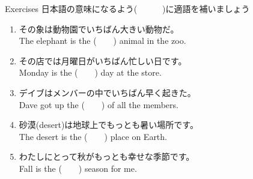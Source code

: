 \documentclass[aspectratio=169,xcolor={dvipsnames,table}]{beamer}
\begin{document}
\begin{frame}[plain]{Exercises}
日本語の意味になるよう(~~~~~~)に適語を補いましょう%
\hfill{\scriptsize {}}
 \begin{enumerate}
  \item その象は動物園でいちばん大きい動物だ。\\
	The elephant is the (~~~~) animal in the zoo. \visible<2->{または\textcolor{BurntOrange}{biggest}}
  \item その店では月曜日がいちばん忙しい日です。\\
	Monday is the (~~~~) day at the store.
  \item デイブはメンバーの中でいちばん早く起きた。\\
	Dave got up the (~~~~) of all the members.
  \item 砂漠(desert)は地球上でもっとも暑い場所です。\\
	The desert is the (~~~~) place on Earth.
  \item わたしにとって秋がもっとも幸せな季節です。\\
	Fall  is the (~~~~) season for me.
 \end{enumerate}
\end{frame}
\end{document}
